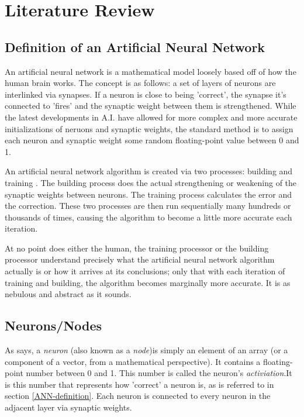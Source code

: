 \documentclass[12pt]{article}
\begin{document}
\section{Literature Review}

\subsection{Definition of an Artificial Neural Network \label{ANN-definition}}

An artificial neural network is a mathematical model loosely based off of how the human brain works. The concept is as follows: a set of layers of neurons are interlinked via synapses. If a neuron is close to being 'correct', the synapse it's connected to 'fires' and the synaptic weight between them is strengthened. While the latest developments in A.I. have allowed for more complex and  more accurate initializations of neruons and synaptic weights, the standard method is to assign each neuron and synaptic weight some random floating-point value between 0 and 1.

An artificial neural network algorithm is created via two processes: building and training \textcite{GCPGreyAI}. The building process does the actual strengthening or weakening of the synaptic weights between neurons. The training  process calculates the error and the correction. These two processes are then run sequentially many hundreds or thousands of times, causing the algorithm to become a little more accurate each iteration.

At no point does either the human, the training processor or the building processor understand precisely what the artificial neural network algorithm actually is or how it arrives at its conclusions; only that with each iteration of training and building, the algorithm becomes marginally more accurate. It is as nebulous and abstract as it sounds.

\subsection{Neurons/Nodes \label{neuron}}

As \textcite{DeepLearningCh1} says, a \textit{neuron} (also known as a \textit{node})is simply an element of an array (or a component of a vector, from a mathematical perspective). It contains a floating-point number between 0 and 1. This number is called the neuron's \textit{activiation}.It is this number that represents how 'correct' a neuron is, as is referred to in section \ref{ANN-definition}. Each neuron is connected to every neuron in the adjacent layer via synaptic weights.
\end{document}
